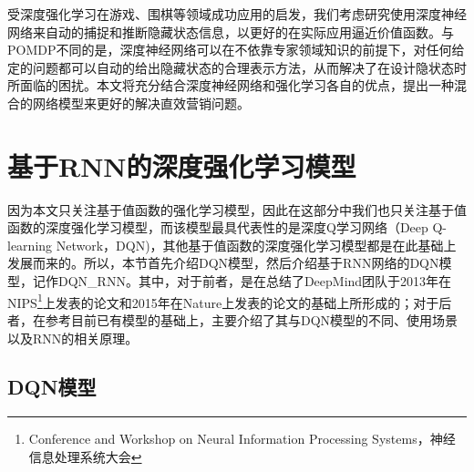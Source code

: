 受深度强化学习在游戏、围棋等领域\citep{mnih2013playing,mnih2015human}成功应用的启发，我们考虑研究使用深度神经网络来自动的捕捉和推断隐藏状态信息，以更好的在实际应用逼近价值函数。与POMDP不同的是，深度神经网络可以在不依靠专家领域知识的前提下，对任何给定的问题都可以自动的给出隐藏状态的合理表示方法\citep{deng2014deep}，从而解决了在设计隐状态时所面临的困扰。本文将充分结合深度神经网络和强化学习各自的优点，提出一种混合的网络模型来更好的解决直效营销问题。

\section{基于RNN的深度强化学习模型}
因为本文只关注基于值函数的强化学习模型，因此在这部分中我们也只关注基于值函数的深度强化学习模型，而该模型最具代表性的是深度Q学习网络（Deep Q-learning Network，DQN)，其他基于值函数的深度强化学习模型都是在此基础上发展而来的。所以，本节首先介绍DQN模型，然后介绍基于RNN网络的DQN模型，记作DQN\_RNN。其中，对于前者，是在总结了DeepMind团队于2013年在NIPS\footnote{Conference and Workshop on Neural Information Processing Systems，神经信息处理系统大会}上发表的论文\citep{mnih2013playing}和2015年在Nature上发表的论文\citep{mnih2015human}的基础上所形成的；对于后者，在参考目前已有模型\citep{hausknecht2015deep,narasimhan2015language}的基础上，主要介绍了其与DQN模型的不同、使用场景以及RNN的相关原理。



\subsection{DQN模型}

